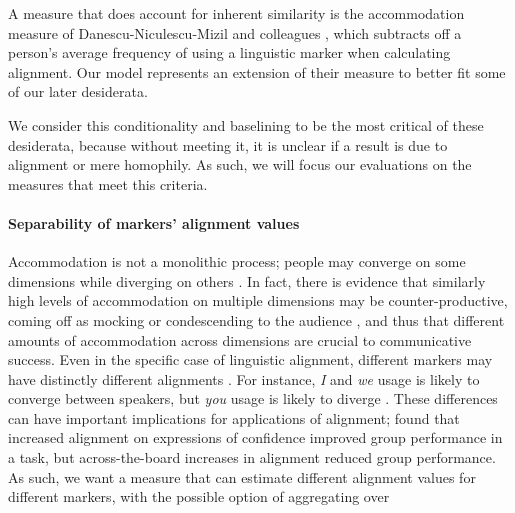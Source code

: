 \documentclass{acm_proc_article-sp}
\begin{document}
A measure that does account for inherent similarity is the accommodation measure of Danescu-Niculescu-Mizil and colleagues \cite{DNMGamonDumais2011,DNMLee2011,DNMEtAl2012}, which subtracts off a person's average frequency of using a linguistic marker when calculating alignment.  Our model represents an extension of their measure to better fit some of our later desiderata.

We consider this conditionality and baselining to be the most critical of these desiderata, because without meeting it, it is unclear if a result is due to alignment or mere homophily.  As such, we will focus our evaluations on the measures that meet this criteria.

\paragraph{Separability of markers' alignment values} Accommodation is not a monolithic process; people may converge on some dimensions while diverging on others \cite{BilousKrauss1988,Ferrara1991}. In fact, there is evidence that similarly high levels of accommodation on multiple dimensions may be counter-productive, coming off as mocking or condescending to the audience \cite{GilesSmith1979,GilesCouplandCoupland1991}, and thus that different amounts of accommodation across dimensions are crucial to communicative success. Even in the specific case of linguistic alignment, different markers may have distinctly different alignments \cite{DNMGamonDumais2011,IrelandEtAl2011}. For instance, \textit{I} and \textit{we} usage is likely to converge between speakers, but \textit{you} usage is likely to diverge \cite{NiederhofferPennebaker2002?,GonzalezHancockPennebaker2009?}. These differences can have important implications for applications of alignment; \cite{FusaroliEtAl2012} found that increased alignment on expressions of confidence improved group performance in a task, but across-the-board increases in alignment reduced group performance.  As such, we want a measure that can estimate different alignment values for different markers, with the possible option of aggregating over 
\end{document}
